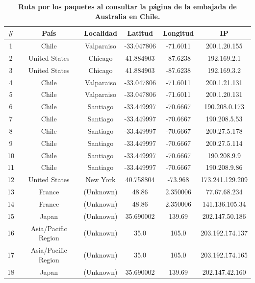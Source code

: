 \documentclass[12pt]{article}
\begin{document}
\begin{table}[H]
\centering
\begin{tabular}{| c | c | c | c | c | c |}
\hline
\# & País & Localidad & Latitud & Longitud & IP\\
\hline
1 & Chile & Valparaiso & -33.047806 & -71.6011 & 200.1.20.155\\
\hline
2 & United States & Chicago & 41.884903 & -87.6238 & 192.169.2.1\\
\hline
3 & United States & Chicago & 41.884903 & -87.6238 & 192.169.3.2\\
\hline
4 & Chile & Valparaiso & -33.047806 & -71.6011 & 200.1.21.131\\
\hline
5 & Chile & Valparaiso & -33.047806 & -71.6011 & 200.1.20.131\\
\hline
6 & Chile & Santiago & -33.449997 & -70.6667 & 190.208.0.173\\
\hline
7 & Chile & Santiago & -33.449997 & -70.6667 & 190.208.5.53\\
\hline
8 & Chile & Santiago & -33.449997 & -70.6667 & 200.27.5.178\\
\hline
9 & Chile & Santiago & -33.449997 & -70.6667 & 200.27.5.114\\
\hline
10 & Chile & Santiago & -33.449997 & -70.6667 & 190.208.9.9\\
\hline
11 & Chile & Santiago & -33.449997 & -70.6667 & 190.208.9.86\\
\hline
12 & United States & New York & 40.758804 & -73.968 & 173.241.129.209\\
\hline
13 & France & (Unknown) & 48.86 & 2.350006 & 77.67.68.234\\
\hline
14 & France & (Unknown) & 48.86 & 2.350006 & 141.136.105.34\\
\hline
15 & Japan & (Unknown) & 35.690002 & 139.69 & 202.147.50.186\\
\hline
16 & Asia/Pacific Region & (Unknown) & 35.0 & 105.0 & 203.192.174.137\\
\hline
17 & Asia/Pacific Region & (Unknown) & 35.0 & 105.0 & 203.192.174.165\\
\hline
18 & Japan & (Unknown) & 35.690002 & 139.69 & 202.147.42.160\\
\hline
\end{tabular}
\caption{\small \textbf{Ruta por los paquetes al consultar la página de la embajada de Australia en Chile.}}
\end{table}
\end{document}
